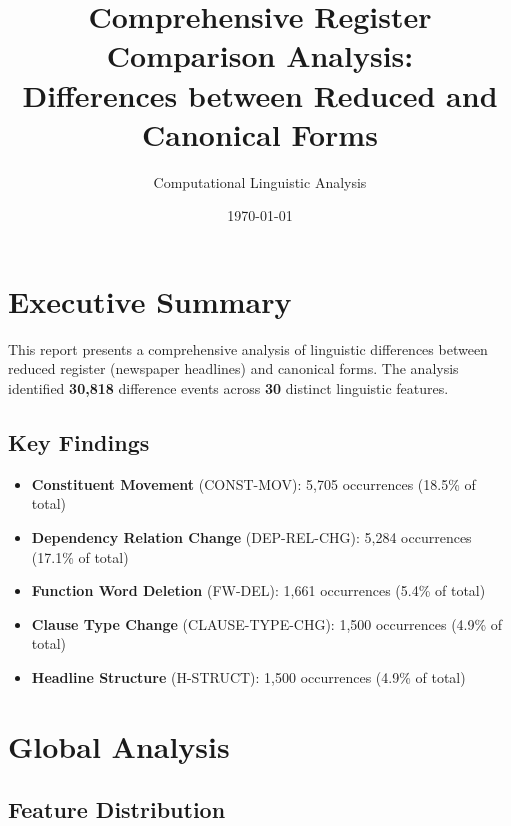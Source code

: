 \documentclass[11pt,a4paper]{article}
\title{Comprehensive Register Comparison Analysis:\\Differences between Reduced and Canonical Forms}
\author{Computational Linguistic Analysis}
\date{\today}
\begin{document}
\maketitle
\tableofcontents
\newpage

\section{Executive Summary}

This report presents a comprehensive analysis of linguistic differences between reduced register (newspaper headlines) and canonical forms. The analysis identified \textbf{30,818} difference events across \textbf{30} distinct linguistic features.

\subsection{Key Findings}
\begin{itemize}
\item \textbf{Constituent Movement} (CONST-MOV): 5,705 occurrences (18.5\% of total)
\item \textbf{Dependency Relation Change} (DEP-REL-CHG): 5,284 occurrences (17.1\% of total)
\item \textbf{Function Word Deletion} (FW-DEL): 1,661 occurrences (5.4\% of total)
\item \textbf{Clause Type Change} (CLAUSE-TYPE-CHG): 1,500 occurrences (4.9\% of total)
\item \textbf{Headline Structure} (H-STRUCT): 1,500 occurrences (4.9\% of total)
\end{itemize}

\section{Global Analysis}

\subsection{Feature Distribution}
\end{document}
